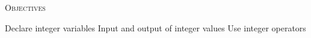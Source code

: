 \textsc{Objectives}
 \begin{myenum}
   \li Declare integer variables
   \li Input and output of integer values
   \li Use integer operators
 \end{myenum}
\mbox{}\\
